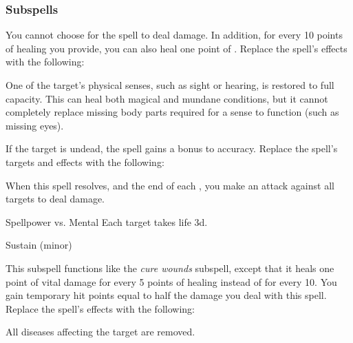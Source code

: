 \subsubsection{Subspells}
You cannot choose for the spell to deal damage.
In addition, for every 10 points of healing you provide, you can also heal one point of .
Replace the spell's effects with the following:
\begin{spellcontent}
\begin{augmenteffects}
\spelleffect
One of the target's physical senses, such as sight or hearing, is restored to full capacity.
This can heal both magical and mundane conditions, but it cannot completely replace missing body parts required for a sense to function (such as missing eyes).
\end{augmenteffects}
\end{spellcontent}
If the target is undead, the spell gains a  bonus to accuracy.
Replace the spell's targets and effects with the following:
\begin{spellcontent}
\begin{augmenttargetinginfo}
\end{augmenttargetinginfo}
\begin{augmenteffects}
\spelleffect
When this spell resolves, and the end of each , you make an attack against all targets to deal damage.
\begin{spellattack}{Spellpower vs. Mental}
\spellsuccess
Each target takes life  \minus3d.
\end{spellattack}
\spelldur Sustain (minor)
\end{augmenteffects}
\end{spellcontent}
This subspell functions like the \textit{cure wounds} subspell, except that it heals one point of vital damage for every 5 points of healing instead of for every 10.
You gain temporary hit points equal to half the damage you deal with this spell.
Replace the spell's effects with the following:
\begin{spellcontent}
\begin{augmenteffects}
\spelleffect
All diseases affecting the target are removed.
\end{augmenteffects}
\end{spellcontent}
